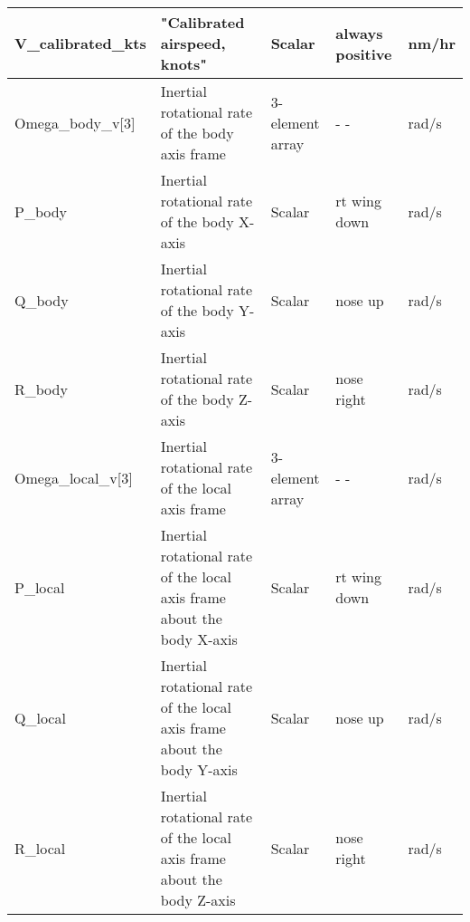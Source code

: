 \documentclass[10pt]{article}
\begin{document}
{\begin{tabular}{|l|p{2.0in}|p{1.0in}|p{1.0in}|l|}
V\_calibrated\_kts & "Calibrated airspeed, knots" & Scalar & always positive & nm/hr \\ 
\hline
Omega\_body\_v[3] & Inertial rotational rate of the body axis frame & 3-element array &          - - & rad/s \\ 
P\_body & Inertial rotational rate of the body X-axis & Scalar & rt wing down & rad/s \\ 
Q\_body & Inertial rotational rate of the body Y-axis & Scalar & nose up & rad/s \\ 
R\_body & Inertial rotational rate of the body Z-axis & Scalar & nose right & rad/s \\ 
\hline
Omega\_local\_v[3] & Inertial rotational rate of the local axis frame & 3-element array &          - - & rad/s \\ 
P\_local & Inertial rotational rate of the local axis frame about the body X-axis & Scalar & rt wing down & rad/s \\ 
Q\_local & Inertial rotational rate of the local axis frame about the body Y-axis & Scalar & nose up & rad/s \\ 
R\_local & Inertial rotational rate of the local axis frame about the body Z-axis & Scalar & nose right & rad/s \\ 
\hline
\end{tabular}
}
\end{document}
